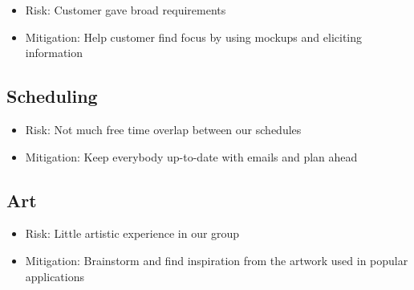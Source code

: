 \documentclass[11pt,a4paper,oneside]{article}
\begin{document}
\begin{itemize}
\item Risk: Customer gave broad requirements
\item Mitigation: Help customer find focus by using mockups and eliciting information
\end{itemize}


\subsection{Scheduling}

\begin{itemize}
\item Risk: Not much free time overlap between our schedules
\item Mitigation: Keep everybody up-to-date with emails and plan ahead
\end{itemize}


\subsection{Art}

\begin{itemize}
\item Risk: Little artistic experience in our group
\item Mitigation: Brainstorm and find inspiration from the artwork used in popular applications
\end{itemize}
\end{document}
